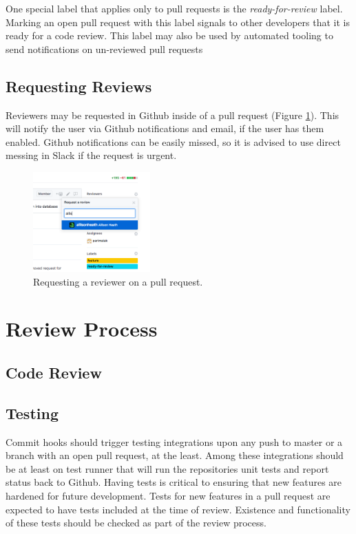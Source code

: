 \documentclass[a4paper,12pt,titlepage]{scrartcl}
\begin{document}
	One special label that applies only to pull requests is the {\em ready-for-review} label.
	Marking an open pull request with this label signals to other developers that it is ready for a code review.
	This label may also be used by automated tooling to send notifications on un-reviewed pull requests
	
	\subsection{Requesting Reviews}
   	
   	Reviewers may be requested in Github inside of a pull request (Figure \ref{fig:requestreviewer}).
   	This will notify the user via Github notifications and email, if the user has them enabled.
   	Github notifications can be easily missed, so it is advised to use direct messing in Slack if the request is urgent.
   	
   	\begin{figure}
  		\centering
    		\includegraphics[width=0.4\textwidth]{images/requestreviewer.png}
    		\caption{Requesting a reviewer on a pull request.}
    		\label{fig:requestreviewer}
   	\end{figure}
   
	\section{Review Process}
	
	\subsection{Code Review}
	
	\subsection{Testing}
	
	Commit hooks should trigger testing integrations upon any push to master or a branch with an open pull request, at the least.
	Among these integrations should be at least on test runner that will run the repositories unit tests and report status back to Github.
	Having tests is critical to ensuring that new features are hardened for future development.
	Tests for new features in a pull request are expected to have tests included at the time of review.
	Existence and functionality of these tests should be checked as part of the review process.
	
\end{document}

